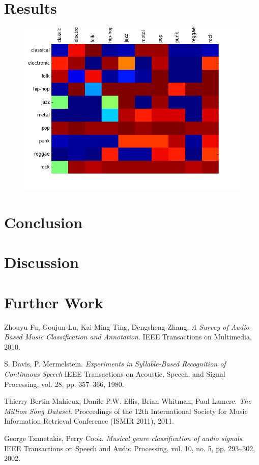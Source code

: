 \documentclass{article} %
\begin{document}
\section{Results}
\begin{figure}[h]
\centering
\includegraphics[scale=0.5]{confusion}
\end{figure}
\section{Conclusion}
\section{Discussion}
\section{Further Work}
\begin{thebibliography}{10}
Zhouyu Fu, Goujun Lu, Kai Ming Ting, Dengsheng Zhang.
\textit{A Survey of Audio-Based Music Classification and Annotation}.
IEEE Transactions on Multimedia, 2010.

S. Davis, P. Mermelstein.
\textit{Experiments in Syllable-Based Recognition of Continuous Speech}
IEEE Transactions on Acoustic, Speech, and Signal Processing, vol. 28, pp. 357--366, 1980.

Thierry Bertin-Mahieux, Danile P.W. Ellis, Brian Whitman, Paul Lamere.
\textit{The Million Song Dataset}.
Proceedings of the 12th International Society for Music Information Retrieval Conference (ISMIR 2011), 2011.

George Tzanetakis, Perry Cook.
\textit{Musical genre classification of audio signals}.
IEEE Transactions on Speech and Audio Processing, vol. 10, no. 5, pp. 293--302, 2002.
\end{thebibliography}
\end{document}
